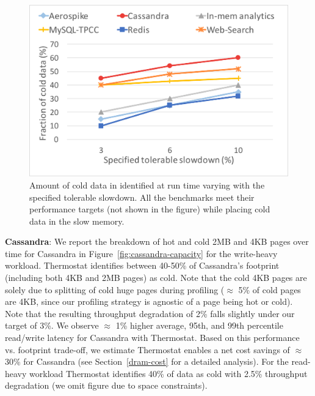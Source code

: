
\begin{figure}[t]
\centering
\includegraphics[width=0.8\columnwidth]{asplos2017/figures/slowdown-capacity-sweep.pdf}
\caption{Amount of cold data in identified at run
time varying with the specified tolerable slowdown. All the benchmarks meet
their performance targets (not shown in the figure) while placing cold data in
the slow memory.}
\label{fig:slowdown-capacity}
\end{figure}

\textbf{Cassandra}:
We report the breakdown of hot and cold 2MB and 4KB pages over time for 
Cassandra in Figure~\ref{fig:cassandra-capacity} for the write-heavy workload. 
Thermostat identifies between 40-50\% of Cassandra's footprint
(including both 4KB and 2MB pages) as cold. Note that the cold 4KB pages are
solely due to splitting of cold huge pages during profiling ($\approx$ 5\% of
cold pages are 4KB, since our profiling strategy is agnostic of a page being hot
or cold).
Note that the resulting throughput degradation of 2\% falls slightly under our 
target of 3\%. We observe $\approx$ 1\% higher average, 95th, and 99th percentile read/write
latency for Cassandra with Thermostat.
Based on this performance vs. footprint trade-off, we estimate Thermostat 
enables a net cost savings of $\approx$ 30\% for Cassandra (see
Section~\ref{dram-cost} for a detailed analysis). For the read-heavy workload
Thermostat identifies 40\% of data as cold with 2.5\% throughput degradation (we
omit figure due to space constraints).

